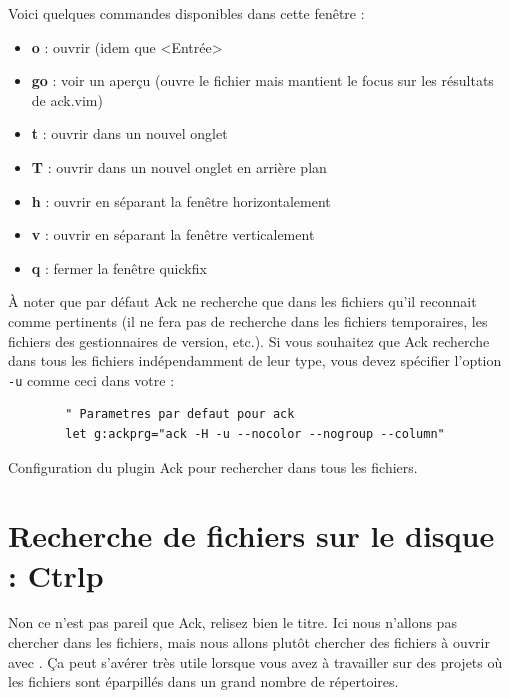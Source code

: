 Voici quelques commandes disponibles dans cette fenêtre :

\begin{itemize}
    \item \textbf{o} : ouvrir (idem que <Entrée>
    \item \textbf{go} : voir un aperçu (ouvre le fichier mais mantient le focus sur les résultats de ack.vim)
    \item \textbf{t} : ouvrir dans un nouvel onglet
    \item \textbf{T} : ouvrir dans un nouvel onglet en arrière plan
    \item \textbf{h} : ouvrir en séparant la fenêtre horizontalement
    \item \textbf{v} : ouvrir en séparant la fenêtre verticalement
    \item \textbf{q} : fermer la fenêtre quickfix
\end{itemize}

\bigskip

À noter que par défaut Ack ne recherche que dans les fichiers qu'il reconnait comme pertinents (il ne fera pas de recherche dans les fichiers temporaires, les fichiers des gestionnaires de version, etc.). Si vous souhaitez que Ack recherche dans tous les fichiers indépendamment de leur type, vous devez spécifier l'option \Verb|-u| comme ceci dans votre \vimrc :

\begin{listing}[H]

    \begin{verbatim}
        " Parametres par defaut pour ack
        let g:ackprg="ack -H -u --nocolor --nogroup --column"
    \end{verbatim}
    \caption{Configuration du plugin Ack pour rechercher dans tous les fichiers.}
    \label{code:leader}
\end{listing}

\section{Recherche de fichiers sur le disque : Ctrlp}

Non ce n'est pas pareil que Ack, relisez bien le titre. Ici nous n'allons pas chercher dans les fichiers, mais nous allons plutôt chercher des fichiers à ouvrir avec \vim. Ça peut s'avérer très utile lorsque vous avez à travailler sur des projets où les fichiers sont éparpillés dans un grand nombre de répertoires.


